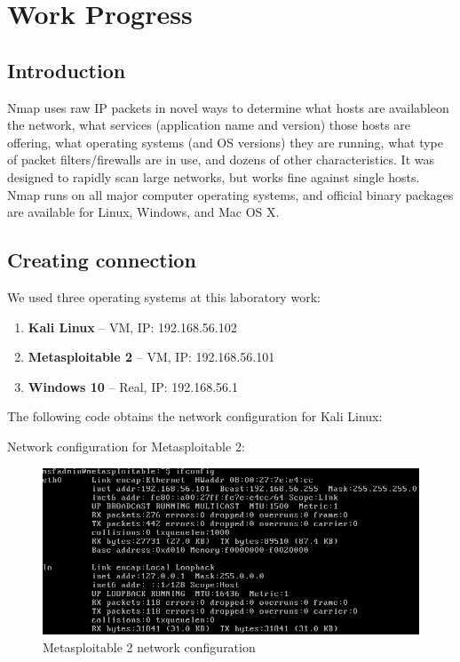 \documentclass[14pt,a4paper,report]{report}
\begin{document}
\clearpage

\section{Work Progress}

\subsection{Introduction}

Nmap uses raw IP packets in novel ways to determine what hosts are availableon the network, what services (application name and version) those hosts are offering, what operating systems (and OS versions) they are running, what type of packet filters/firewalls are in use, and dozens of other characteristics. It was designed to rapidly scan large networks, but works fine against single hosts. Nmap runs on all major computer operating systems, and official binary packages are available for Linux, Windows, and Mac OS X.

\subsection{Creating connection}

We used three operating systems at this laboratory work:

\begin{enumerate}
	\item \textbf{Kali Linux} -- VM, IP: 192.168.56.102
	\item \textbf{Metasploitable 2} -- VM, IP: 192.168.56.101
	\item \textbf{Windows 10} -- Real, IP: 192.168.56.1
\end{enumerate}

The following code obtains the network configuration for Kali Linux:



Network configuration for Metasploitable 2:

\begin{figure}[h!]
	\centering
	\includegraphics[scale = 0.90]{images/1.png}
	\caption{Metasploitable 2 network configuration}
\end{figure}
\end{document}
